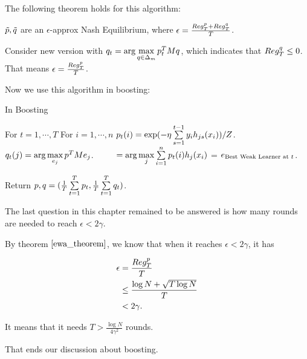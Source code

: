 \documentclass[main.tex]{subfiles}
\begin{document}
The following theorem holds for this algorithm:

\begin{theorem}
	$\tilde{p}, \tilde{q}$ are an $\epsilon$-approx Nash Equilibrium, where $\epsilon = \frac{Reg^p_T + Reg^q_T}{T}$.
\end{theorem}

\begin{corollary}
	Consider new version with $q_t = \arg\max\limits_{q \in \Delta_m} p_t^TMq$, which indicates that $Reg_T^q \leq 0$. That means $\epsilon = \frac{Reg_T^p}{T}$.
\end{corollary}

Now we use this algorithm in boosting:

\begin{algorithm}[H]
	\caption{In Boosting}
	\begin{algorithmic}
		\STATE For $t = 1, \cdots ,T$
		\bindent
		\STATE For $i = 1, \cdots , n$
		\bindentt
		\STATE $p_t(i) = \exp(-\eta \sum\limits_{s=1}^{t-1} y_i h_{js}(x_i)) / Z$.
		\eindentt
		\STATE $q_t(j) =  \arg\max\limits_{e_j} p^T Me_j$.
		\STATE $\ \ \ \ \ \ \  =  \arg\max\limits_{j} \sum\limits_{i = 1}^n \p_t(i) h_j(x_i) $ = $e_{\textmd{Best Weak Learner at }t}$.

		
		Return $p, q = (\frac{1}{T} \sum\limits_{t = 1}^T p_t, \frac{1}{T} \sum\limits_{t = 1}^T q_t) $. 
		\eindent
	\end{algorithmic}
\end{algorithm}

The last question in this chapter remained to be answered is how many rounds are needed to reach $\epsilon <2\gamma$.

By theorem $\ref{ewa_theorem}$, we know that when it reaches $\epsilon <2\gamma$, it has

\begin{equation*}
	\begin{aligned}
	\epsilon &= \frac{Reg_T^p}{T}\\ 
	&\leq \frac{\log N + \sqrt{T\log N}}{T} \\
	& < 2\gamma.
	\end{aligned}
\end{equation*}

It means that it needs $T > \frac{\log N}{4\gamma^2}$ rounds.

That ends our discussion about boosting.
\end{document}
